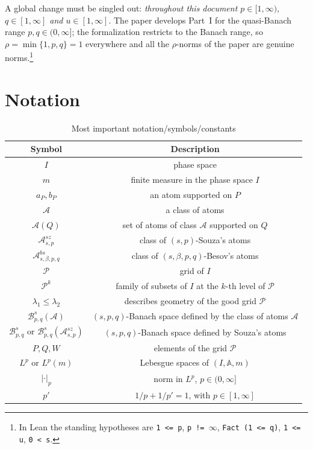 \documentclass[11pt]{amsart}
\theoremstyle{definition}
\newcommand{\lean}[1]{\texttt{#1}}
\begin{document}
A global change must be singled out: \emph{throughout this document
$p \in [1,\infty)$, $q \in [1,\infty]$ and $u \in [1,\infty]$}. The paper
develops Part~I for the quasi-Banach range $p,q \in (0,\infty]$; the
formalization restricts to the Banach range, so $\rho=\min\{1,p,q\}=1$
everywhere and all the $\rho$-norms of the paper are genuine
norms.\footnote{In Lean the standing hypotheses are \lean{1 <= p},
\lean{p != \(\infty\)}, \lean{Fact (1 <= q)}, \lean{1 <= u}, \lean{0 < s}.}

\section{Notation}

\begin{table}[h]
  \centering
  \caption{Most important notation/symbols/constants}
  \label{tab:table1}
  \begin{tabular}{cc}
    \toprule
    Symbol & Description\\
    \midrule
    $I$ & phase space\\
    $m$ & finite measure in the phase space $I$\\
    $a_P, b_P$ & an atom supported on $P$\\
    $\mathcal{A}$ & a class of atoms \\
    $\mathcal{A}(Q)$ & set of atoms of class $\mathcal{A}$ supported on $Q$ \\
    $\mathcal{A}^{sz}_{s,p}$& class of $(s,p)$-Souza's atoms \\
    $\mathcal{A}^{bs}_{s,\beta,p,q}$ & class of $(s,\beta,p,q)$-Besov's atoms \\
    $\mathcal{P}$ & grid of $I$\\
    $\mathcal{P}^k$ & family of subsets of $I$ at the $k$-th level of $\mathcal{P}$\\
    $\lambda_1 \leq \lambda_2$ & describes geometry of the good grid $\mathcal{P}$\\
    $\mathcal{B}^s_{p,q}(\mathcal{A})$ & $(s,p,q)$-Banach space defined by the class of atoms $\mathcal{A}$\\
    $\mathcal{B}^s_{p,q}$ or $\mathcal{B}^s_{p,q}(\mathcal{A}^{sz}_{s,p})$ & $(s,p,q)$-Banach space defined by Souza's atoms\\
    $P, Q, W$ & elements of the grid $\mathcal{P}$\\
    $L^p$ or $L^p(m)$ & Lebesgue spaces of $(I,\mathbb{A}, m)$ \\
    $|\cdot|_p$ & norm in $L^p$, $p \in (0,\infty]$ \\
    $p'$ & $1/p+1/p'=1$, with $p\in [1,\infty]$ \\
    \bottomrule
  \end{tabular}
\end{table}
\end{document}
